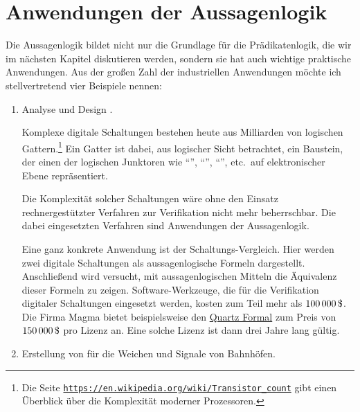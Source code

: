 \section{Anwendungen der Aussagenlogik}
Die Aussagenlogik bildet nicht nur die Grundlage für die Prädikatenlogik, die wir im nächsten Kapitel
diskutieren werden, sondern sie hat auch wichtige prak\-tische Anwendungen.  Aus der großen Zahl der
industriellen Anwendungen möchte ich stellvertretend vier Beispiele nennen: 
\begin{enumerate}
\item Analyse und Design .

      Komplexe digitale Schaltungen bestehen heute aus Milliarden von logischen Gattern.\footnote{Die Seite 
      \href{https://en.wikipedia.org/wiki/Transistor_count}{\texttt{https://en.wikipedia.org/wiki/Transistor\_count}}
      gibt einen Überblick über die Komplexität moderner Prozessoren.}
      Ein Gatter ist dabei, aus logischer Sicht betrachtet, ein Baustein, der einen
      der logischen Junktoren wie ``'', ``'', ``'',
      etc.~auf elektronischer Ebene repräsentiert. 
  
      Die Komplexität solcher Schaltungen wäre ohne den Einsatz
      rechnergestützter Verfahren zur Verifikation nicht mehr beherrschbar.  Die
      dabei eingesetzten Verfahren sind Anwendungen der Aussagenlogik. 

      Eine ganz konkrete Anwendung ist der Schaltungs-Vergleich.  Hier werden zwei
      digitale Schaltungen als aussagenlogische Formeln dargestellt.
      Anschließend wird versucht, mit aussagenlogischen Mitteln die Äquivalenz dieser
      Formeln zu zeigen. Software-Werkzeuge, die für die Verifikation digitaler
      Schaltungen eingesetzt werden, kosten zum Teil mehr als $100\,000\,\symbol{36}$.
      Die Firma Magma bietet beispielsweise den 
      \href{https://www.eetimes.com/document.asp?doc_id=1217672}{Quartz Formal} zum Preis
      von $150\,000\,
      \symbol{36}$ pro Lizenz an.  Eine solche Lizenz ist dann drei Jahre lang gültig.
\item Erstellung von  für die Weichen und Signale von Bahnhöfen.


\end{enumerate}
